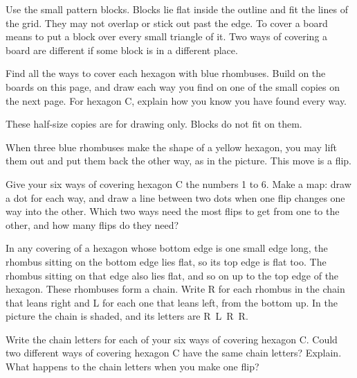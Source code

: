 \documentclass[12pt]{article}
\newcommand{\body}{\fontsize{12.5}{16}\selectfont}
\newcommand{\withpic}[3]{%
  \noindent\begin{minipage}[t]{#1}\vspace{0pt}\raggedright #2\end{minipage}\hfill
  \begin{minipage}[t]{\dimexpr 7.5in-#1-0.2in\relax}\vspace{2pt}\raggedleft\end{minipage}\par}
\begin{document}
\body

Use the small pattern blocks. Blocks lie flat inside the outline and fit the lines of the grid. They may not overlap or stick out past the edge. To cover a board means to put a block over every small triangle of it. Two ways of covering a board are different if some block is in a different place.

\vspace{0.2in}
 Find all the ways to cover each hexagon with blue rhombuses. Build on the boards on this page, and draw each way you find on one of the small copies on the next page. For hexagon C, explain how you know you have found every way.

\vspace{0.1in}

\newpage
These half-size copies are for drawing only. Blocks do not fit on them.

\vspace{0.1in}

\newpage
{} When three blue rhombuses make the shape of a yellow hexagon, you may lift them out and put them back the other way, as in the picture. This move is a flip.

\vspace{0.12in}
{\centering\par}
\vspace{0.12in}

Give your six ways of covering hexagon C the numbers 1 to 6. Make a map: draw a dot for each way, and draw a line between two dots when one flip changes one way into the other. Which two ways need the most flips to get from one to the other, and how many flips do they need?

\vspace{0.12in}

\newpage
\withpic{4.15in}{ In any covering of a hexagon whose bottom edge is one small edge long, the rhombus sitting on the bottom edge lies flat, so its top edge is flat too. The rhombus sitting on that edge also lies flat, and so on up to the top edge of the hexagon. These rhombuses form a chain. Write R for each rhombus in the chain that leans right and L for each one that leans left, from the bottom up. In the picture the chain is shaded, and its letters are R~L~R~R.}{g45-chain-example}

\vspace{0.15in}
Write the chain letters for each of your six ways of covering hexagon C. Could two different ways of covering hexagon C have the same chain letters? Explain. What happens to the chain letters when you make one flip?
\end{document}
